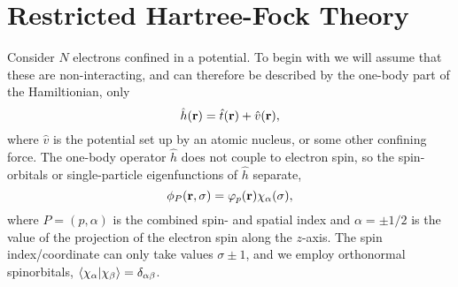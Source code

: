 \section{Restricted Hartree-Fock Theory}

Consider $N$ electrons confined in a potential. 
To begin with we will assume that these are non-interacting, and can therefore be 
described by the one-body part of the Hamiltionian, only
\begin{equation}
    \hat{h}(\vb{r}) = \hat{t}(\vb{r}) + \hat{v}(\vb{r}),
\end{equation}
where $\hat{v}$ is the potential set up by an atomic nucleus, or some other confining
force. The one-body operator $\hat{h}$ does not couple to electron spin, so the 
spin-orbitals or single-particle eigenfunctions of $\hat{h}$ separate,
\begin{equation}
    \phi_P(\vb{r}, \sigma) = \varphi_p(\vb{r})\chi_\alpha(\sigma),
\end{equation}
where $P = (p, \alpha)$ is the combined spin- and spatial index and $\alpha = \pm 1/2$
is the value of the projection of the electron spin along the $z$-axis. The spin 
index/coordinate can only take values $\sigma \pm 1$, and we employ orthonormal 
spinorbitals, $\braket{\chi_\alpha}{\chi_\beta} = \delta_{\alpha\beta}$. 


